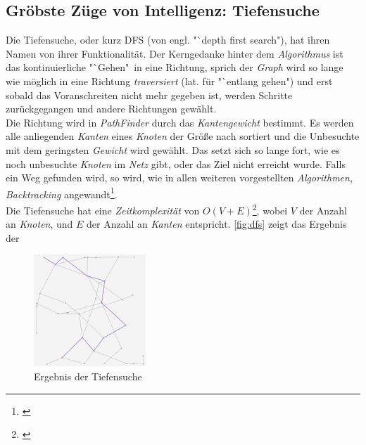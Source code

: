 \documentclass[12pt]{article}
\begin{document}
\subsection{Gröbste Züge von Intelligenz: Tiefensuche}
Die Tiefensuche, oder kurz DFS (von engl. "`depth first search"), hat ihren Namen von ihrer Funktionalität. Der Kerngedanke hinter dem \textit{Algorithmus} ist das kontinuierliche "`Gehen"\ in eine Richtung, sprich der \textit{Graph} wird so lange wie möglich in eine Richtung \textit{traversiert} (lat. für "`entlang gehen") und erst sobald das Voranschreiten nicht mehr gegeben ist, werden Schritte zurückgegangen und andere Richtungen gewählt.
\\
Die Richtung wird in \textit{PathFinder} durch das \textit{Kantengewicht} bestimmt. Es werden alle anliegenden \textit{Kanten} eines \textit{Knoten} der Größe nach sortiert und die Unbesuchte mit dem geringsten \textit{Gewicht} wird gewählt. Das setzt sich so lange fort, wie es noch unbesuchte \textit{Knoten} im \textit{Netz} gibt, oder das Ziel nicht erreicht wurde. Falls ein Weg gefunden wird, so wird, wie in allen weiteren vorgestellten \textit{Algorithmen}, \textit{Backtracking} angewandt\footnote{\cite[Kapitel 22.3, S. 457f]{cormen}}. 
\\
Die Tiefensuche hat eine \textit{Zeitkomplexität} von $O(V + E)$\footnote{\cite[Kapitel 22.3, S. 459]{cormen}}, wobei $V$ der Anzahl an \textit{Knoten}, und $E$ der Anzahl an \textit{Kanten} entspricht. \autoref{fig:dfs} zeigt das Ergebnis der 
\begin{figure}
\vspace{-20pt}
\begin{center}
\includegraphics[width=0.375\textwidth]{res/dfsV2.png}
\end{center}
\vspace{-30pt}
\centering
\caption{Ergebnis der Tiefensuche}
\label{fig:dfs}
\end{figure}
\end{document}
